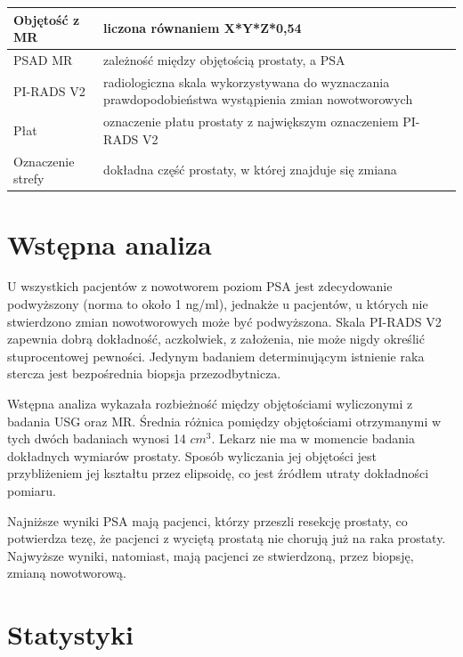 \documentclass[a4paper,11pt,twoside]{report}
\theoremstyle{definition}
\begin{document}
\begin{table}[h!]
\begin{tabular}{|l|p{10cm}|}
Objętość z MR & liczona równaniem X*Y*Z*0,54                                                                         \\ \hline 
PSAD MR & zależność między objętością prostaty, a PSA                                                               \\ \hline 
PI-RADS V2 & radiologiczna skala wykorzystywana do wyznaczania prawdopodobieństwa wystąpienia zmian nowotworowych   \\ \hline 
Płat & oznaczenie płatu prostaty z największym oznaczeniem PI-RADS V2                                               \\ \hline 
Oznaczenie strefy & dokładna część prostaty, w której znajduje się zmiana                                           \\ \hline 
\end{tabular}
\label{Dane szpitalne}
\end{table}


\section{Wstępna analiza}
U wszystkich pacjentów z nowotworem poziom PSA jest zdecydowanie podwyższony (norma to około 1 ng/ml), jednakże u pacjentów, u których nie stwierdzono zmian nowotworowych może być podwyższona. Skala PI-RADS V2 zapewnia dobrą dokładność, aczkolwiek, z założenia, nie może nigdy określić stuprocentowej pewności. Jedynym badaniem determinującym istnienie raka stercza jest bezpośrednia biopsja przezodbytnicza. 
\par 
Wstępna analiza wykazała rozbieżność między objętościami wyliczonymi z badania USG oraz MR. Średnia różnica pomiędzy objętościami otrzymanymi w tych dwóch badaniach wynosi 14 $cm^3$. Lekarz nie ma w momencie badania dokładnych wymiarów prostaty. Sposób wyliczania jej objętości jest przybliżeniem jej kształtu przez elipsoidę, co jest źródłem utraty dokładności pomiaru.
\par 
Najniższe wyniki PSA mają pacjenci, którzy przeszli resekcję prostaty, co potwierdza tezę, że pacjenci z wyciętą prostatą nie chorują już na raka prostaty. Najwyższe wyniki, natomiast, mają pacjenci ze stwierdzoną, przez biopsję, zmianą nowotworową.

\section{Statystyki}
\end{document}
